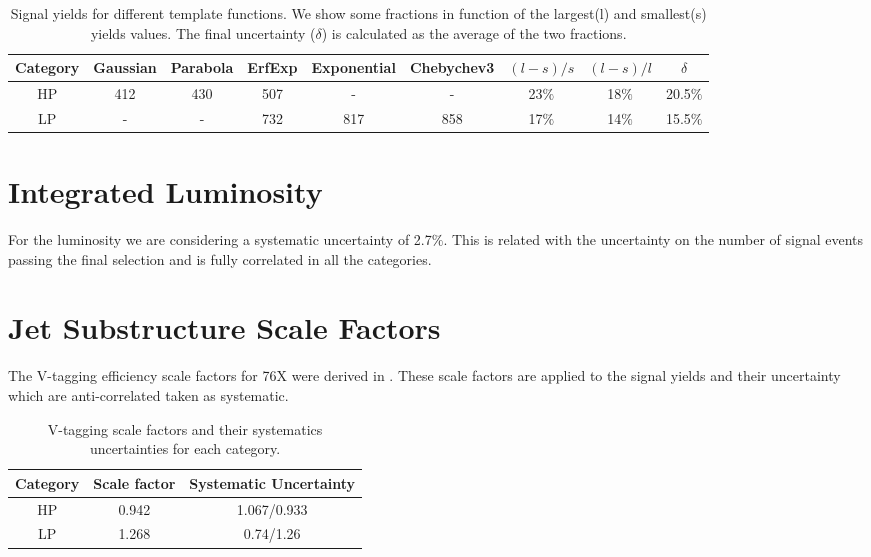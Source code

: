 \begin{table}[h]
\footnotesize 
\begin{center}
\caption{Signal yields for different template functions. We show some fractions in function of the largest(l) and smallest(s) yields values. The final uncertainty ($\delta$) is calculated as the average of the two fractions.}
\label{tab:backyields2}
\begin{tabular}{ccccccccc} \hline
Category  & Gaussian & Parabola & ErfExp & Exponential & Chebychev3 & $(l-s)/s$ & $(l-s)/l$ & $\delta$ \\ \hline
HP & 412 & 430 & 507 & - & - & 23$\%$ & 18$\%$ &  20.5$\%$ \\
LP & -  & - & 732 & 817 & 858 & 17$\%$  & 14$\%$ & 15.5$\%$ \\ \hline
\end{tabular}
\end{center}
\end{table}

\section{Integrated Luminosity}\label{sys_uncert_lumi}
For the luminosity we are considering a systematic uncertainty of 2.7$\%$. This is related with the uncertainty on the number of signal events passing the final selection and is fully correlated in all the categories.

\section{Jet Substructure Scale Factors}\label{sys_uncert_jetSub}
The V-tagging efficiency scale factors for 76X were derived in \cite{CMS-AN-16-215}. These scale factors are applied to the signal yields and their uncertainty which are anti-correlated taken as systematic.

\begin{table}[h]
\small
\begin{center}
\caption{V-tagging scale factors and their systematics uncertainties for each category.}
\label{tab:VtagSF}
\begin{tabular}{ccc} \hline
Category  & Scale factor & Systematic Uncertainty \\ \hline
HP & 0.942 & 1.067/0.933 \\
LP & 1.268  & 0.74/1.26 \\ \hline
\end{tabular}
\end{center}
\end{table}


